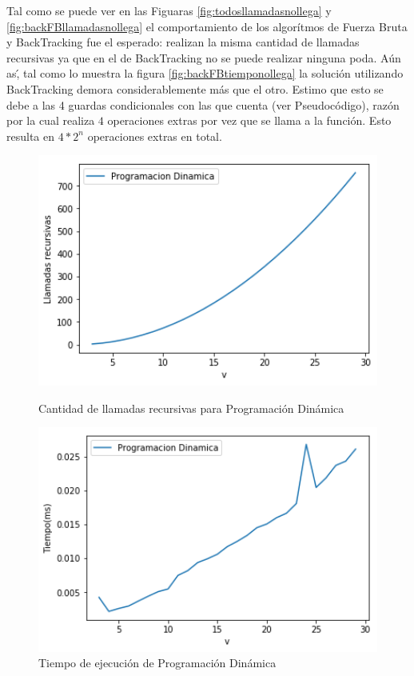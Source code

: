 \par Tal como se puede ver en las Figuaras \ref{fig:todosllamadasnollega} y \ref{fig:backFBllamadasnollega}
el comportamiento de los algor\'itmos de Fuerza Bruta y BackTracking fue el esperado: realizan la misma cantidad 
de llamadas recursivas ya que en el de BackTracking no se puede realizar ninguna poda. A\'un as\', tal como
lo muestra la figura \ref{fig:backFBtiemponollega} la soluci\'on utilizando BackTracking demora considerablemente
m\'as que el otro. Estimo que esto se debe a las 4 guardas condicionales con las que cuenta (ver Pseudoc\'odigo),
raz\'on por la cual realiza $4$ operaciones extras por vez que se llama a la funci\'on. Esto resulta en $4*2^n$ 
operaciones extras en total.

\begin{figure}[H] 
    \centering
    \begin{minipage}{0.45\textwidth}
        \centering
        \includegraphics[width=1\textwidth]{img/nollega/dinamicallamadas.png} %
        \caption{Cantidad de llamadas recursivas para Programaci\'on Din\'amica}
        \label{fig:dinamicallamadasnollega} 
    \end{minipage}\hfill
    \begin{minipage}{0.45\textwidth}
        \centering
        \includegraphics[width=1\textwidth]{img/nollega/dinamicatiempo.png} %
        \caption{Tiempo de ejecuci\'on de Programaci\'on Din\'amica}
        \label{fig:dinamicatiemponollega} 
    \end{minipage}
\end{figure}

